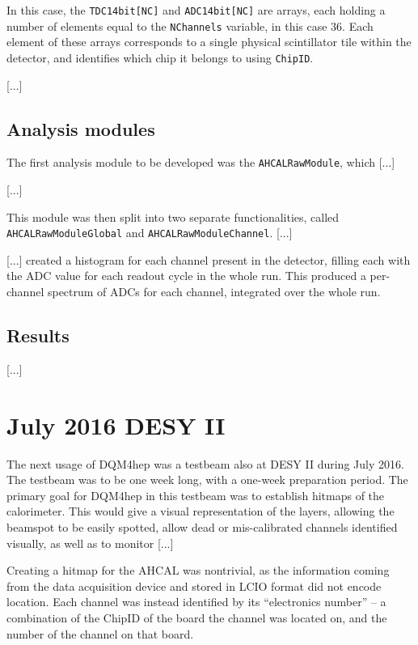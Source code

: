 In this case, the \texttt{TDC14bit[NC]} and \texttt{ADC14bit[NC]} are arrays, each holding a number of elements equal to the \texttt{NChannels} variable, in this case 36. Each element of these arrays corresponds to a single physical scintillator tile within the detector, and identifies which chip it belongs to using \texttt{ChipID}. 

[...]

\subsection{Analysis modules}
The first analysis module to be developed was the \texttt{AHCALRawModule}, which [...]

[...]

This module was then split into two separate functionalities, called \texttt{AHCALRawModuleGlobal} and \texttt{AHCALRawModuleChannel}. [...]

[...] created a histogram for each channel present in the detector, filling each with the ADC value for each readout cycle in the whole run. This produced a per-channel spectrum of ADCs for each channel, integrated over the whole run. %

\subsection{Results} %

[...]

\section{July 2016 DESY II}
The next usage of DQM4hep was a testbeam also at DESY II during July 2016. The testbeam was to be one week long, with a one-week preparation period. The primary goal for DQM4hep in this testbeam was to establish hitmaps of the calorimeter. This would give a visual representation of the layers, allowing the beamspot to be easily spotted, allow dead or mis-calibrated channels identified visually, as well as to monitor [...]

Creating a hitmap for the AHCAL was nontrivial, as the information coming from the data acquisition device and stored in LCIO format did not encode location. Each channel was instead identified by its ``electronics number'' -- a combination of the ChipID of the board the channel was located on, and the number of the channel on that board.

